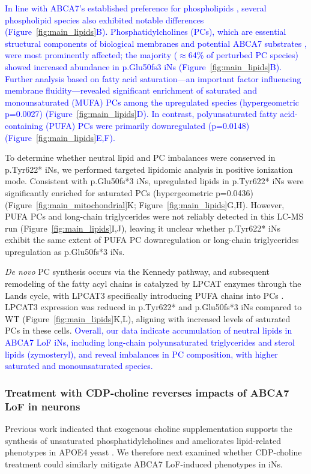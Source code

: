 \newcommand{\quoteB}{\textcolor{blue}{In line with ABCA7's established preference for phospholipids \cite{Tomioka2017-sq,Picataggi2022-hf,Fang2025}, several phospholipid species also exhibited notable differences (Figure~\ref{fig:main_lipids}B). Phosphatidylcholines (PCs), which are essential structural components of biological membranes and potential ABCA7 substrates \cite{LeThiMy2022-dp,Fang2025}, were most prominently affected; the majority ($\approx$64\% of perturbed PC species) showed increased abundance in p.Glu50fs3 iNs (Figure~\ref{fig:main_lipids}B). Further analysis based on fatty acid saturation—an important factor influencing membrane fluidity—revealed significant enrichment of saturated and monounsaturated (MUFA) PCs among the upregulated species (hypergeometric p=0.0027) (Figure~\ref{fig:main_lipids}D). In contrast, polyunsaturated fatty acid-containing (PUFA) PCs were primarily downregulated (p=0.0148) (Figure~\ref{fig:main_lipids}E,F).}}
\quoteB

To determine whether neutral lipid and PC imbalances were conserved in p.Tyr622* iNs, we performed targeted lipidomic analysis in positive ionization mode. Consistent with p.Glu50fs*3 iNs, upregulated lipids in p.Tyr622* iNs were significantly enriched for saturated PCs (hypergeometric p=0.0436) (Figure~\ref{fig:main_mitochondrial}K; Figure~\ref{fig:main_lipids}G,H). However, PUFA PCs and long-chain triglycerides were not reliably detected in this LC-MS run (Figure~\ref{fig:main_lipids}I,J), leaving it unclear whether p.Tyr622* iNs exhibit the same extent of PUFA PC downregulation or long-chain triglycerides upregulation as p.Glu50fs*3 iNs.

\textit{De novo} PC synthesis occurs via the Kennedy pathway, and subsequent remodeling of the fatty acyl chains is catalyzed by LPCAT enzymes through the Lands cycle, with LPCAT3 specifically introducing PUFA chains into PCs \cite{Boumann2003-ew,Wang2019-om,Zhao2008-pq}. LPCAT3 expression was reduced in p.Tyr622* and p.Glu50fs*3 iNs compared to WT (Figure~\ref{fig:main_lipids}K,L), aligning with increased levels of saturated PCs in these cells. \newcommand{\quoteH}{\textcolor{blue}{Overall, our data indicate accumulation of neutral lipids in ABCA7 LoF iNs, including long-chain polyunsaturated triglycerides and sterol lipids (zymosteryl), and reveal imbalances in PC composition, with higher saturated and monounsaturated species.\label{quoteH-label}}}
\quoteH

\subsubsection{Treatment with CDP-choline reverses impacts of ABCA7 LoF in neurons}
Previous work indicated that exogenous choline supplementation supports the synthesis of unsaturated phosphatidylcholines and ameliorates lipid-related phenotypes in APOE4 yeast \cite{Boumann2006-nz,Sienski2021-zt}. We therefore next examined whether CDP-choline treatment could similarly mitigate ABCA7 LoF-induced phenotypes in iNs.

